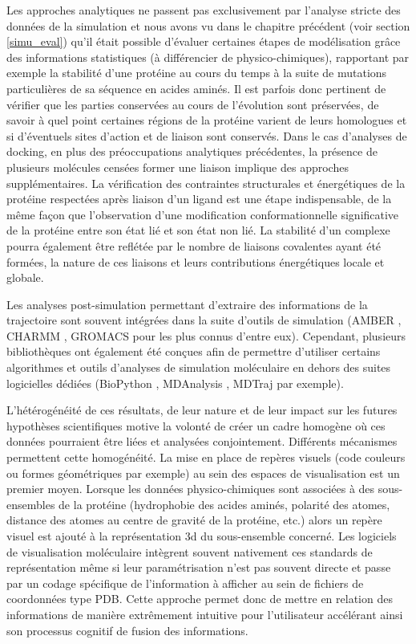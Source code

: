 Les approches analytiques ne passent pas exclusivement par l'analyse stricte des données de la simulation et nous avons vu dans le chapitre précédent (voir section \ref{simu_eval}) qu'il était possible d'évaluer certaines étapes de modélisation grâce des informations statistiques (à différencier de physico-chimiques), rapportant par exemple la stabilité d'une protéine au cours du temps à la suite de mutations particulières de sa séquence en acides aminés. Il est parfois donc pertinent de vérifier que les parties conservées au cours de l'évolution sont préservées, de savoir à quel point certaines régions de la protéine varient de leurs homologues et si d'éventuels sites d'action et de liaison sont conservés.
Dans le cas d'analyses de docking, en plus des préoccupations analytiques précédentes, la présence de plusieurs molécules censées former une liaison implique des approches supplémentaires. La vérification des contraintes structurales et énergétiques de la protéine respectées après liaison d'un ligand est une étape indispensable, de la même façon que l'observation d'une modification conformationnelle significative de la protéine entre son état lié et son état non lié. La stabilité d'un complexe pourra également être reflétée par le nombre de liaisons covalentes ayant été formées, la nature de ces liaisons et leurs contributions énergétiques locale et globale.

Les analyses post-simulation permettant d'extraire des informations de la trajectoire sont souvent intégrées dans la suite d'outils de simulation (AMBER \cite{pearlman1995amber}, CHARMM \cite{brooks2009charmm}, GROMACS \cite{pronk2013gromacs} pour les plus connus d'entre eux). Cependant, plusieurs bibliothèques ont également été conçues afin de permettre d'utiliser certains algorithmes et outils d'analyses de simulation moléculaire en dehors des suites logicielles dédiées (BioPython \cite{cock_biopython:_2009}, MDAnalysis \cite{michaud-agrawal_mdanalysis:_2011}, MDTraj \cite{McGibbon2014MDTraj} par exemple).

L'hétérogénéité de ces résultats, de leur nature et de leur impact sur les futures hypothèses scientifiques motive la volonté de créer un cadre homogène où ces données pourraient être liées et analysées conjointement. 
Différents mécanismes permettent cette homogénéité. La mise en place de repères visuels (code couleurs ou formes géométriques par exemple) au sein des espaces de visualisation est un premier moyen. Lorsque les données physico-chimiques sont associées à des sous-ensembles de la protéine (hydrophobie des acides aminés, polarité des atomes, distance des atomes au centre de gravité de la protéine, etc.) alors un repère visuel est ajouté à la représentation 3d du sous-ensemble concerné. Les logiciels de visualisation moléculaire intègrent souvent nativement ces standards de représentation même si leur paramétrisation n'est pas souvent directe et passe par un codage spécifique de l'information à afficher au sein de fichiers de coordonnées type PDB. Cette approche permet donc de mettre en relation des informations de manière extrêmement intuitive pour l'utilisateur accélérant ainsi son processus cognitif de fusion des informations.


